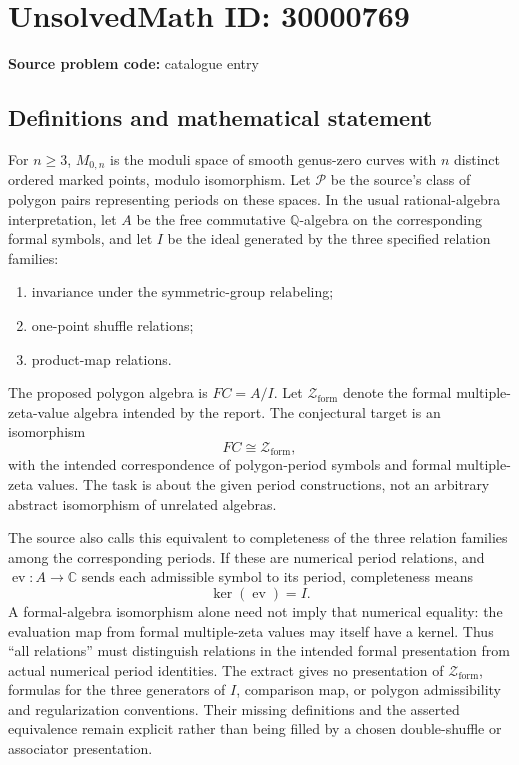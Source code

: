 \documentclass[11pt]{article}
\newcommand{\Q}{\mathbb{Q}}
\newcommand{\C}{\mathbb{C}}
\begin{document}
\section*{UnsolvedMath ID: 30000769}
\textbf{Source problem code:} catalogue entry
\subsection{Definitions and mathematical statement}
For $n\geq3$, $M_{0,n}$ is the moduli space of smooth genus-zero curves with $n$ distinct ordered marked points, modulo isomorphism. Let $\mathcal P$ be the source's class of polygon pairs representing periods on these spaces. In the usual rational-algebra interpretation, let $A$ be the free commutative $\Q$-algebra on the corresponding formal symbols, and let $I$ be the ideal generated by the three specified relation families:
\begin{enumerate}
\item invariance under the symmetric-group relabeling;
\item one-point shuffle relations;
\item product-map relations.
\end{enumerate}
The proposed polygon algebra is $FC=A/I$. Let $\mathcal Z_{\mathrm{form}}$ denote the formal multiple-zeta-value algebra intended by the report. The conjectural target is an isomorphism
\[
FC\cong\mathcal Z_{\mathrm{form}},
\]
with the intended correspondence of polygon-period symbols and formal multiple-zeta values. The task is about the given period constructions, not an arbitrary abstract isomorphism of unrelated algebras.

The source also calls this equivalent to completeness of the three relation families among the corresponding periods. If these are numerical period relations, and $\operatorname{ev}:A\to\C$ sends each admissible symbol to its period, completeness means
\[
\ker(\operatorname{ev})=I.
\]
A formal-algebra isomorphism alone need not imply that numerical equality: the evaluation map from formal multiple-zeta values may itself have a kernel. Thus ``all relations'' must distinguish relations in the intended formal presentation from actual numerical period identities. The extract gives no presentation of $\mathcal Z_{\mathrm{form}}$, formulas for the three generators of $I$, comparison map, or polygon admissibility and regularization conventions. Their missing definitions and the asserted equivalence remain explicit rather than being filled by a chosen double-shuffle or associator presentation.
\end{document}
